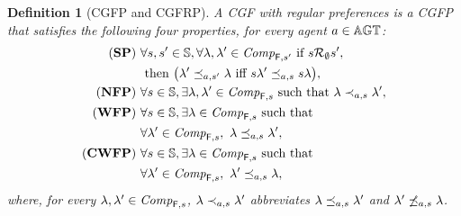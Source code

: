 \documentclass{article}
\newtheorem{definition}{Definition}
\begin{document}
\begin{definition}[CGFP and CGFRP]
A CGF with regular preferences
is a CGFP that satisfies the following four properties, 
for every agent $a \in \mathbb{AGT}$:
    \begin{align*}
       (\mathbf{SP}) \ & \forall s,s' \in \mathbb{S} ,
          \forall \lambda, \lambda' \in 
          \mathit{Comp}_{\mathsf{F},s' } 
          \text{ if } s \mathcal{R}_{\emptyset }  s',
          \\ 
          &
          \text{ then }
          \big(
        \lambda'   \preceq_{a,s'}\lambda  \text{ iff }
        s \lambda'   \preceq_{a,s } s\lambda 
          \big), \\
          (\mathbf{NFP})\  &\forall s\in \mathbb{S}, \exists \lambda ,\lambda' \in \mathit{Comp}_{\mathsf{F},s}\text{ such that } \lambda \prec_{a,s} \lambda' ,\\
          (\mathbf{WFP})\  &\forall s\in \mathbb{S}, \exists \lambda \in \mathit{Comp}_{\mathsf{F},s}\text{ such that } \\
          &\forall \lambda' \in  \mathit{Comp}_{\mathsf{F},s}, \ \lambda \preceq_{a,s} \lambda' ,\\
          (\mathbf{CWFP})\  &\forall s\in \mathbb{S}, \exists \lambda \in \mathit{Comp}_{\mathsf{F},s}\text{ such that }\\
          & \forall \lambda' \in \mathit{Comp}_{\mathsf{F},s}, \ \lambda' \preceq_{a,s} \lambda,
          \end{align*}
where, for every $\lambda, \lambda' \in\mathit{Comp}_{\mathsf{F},s} $, 
$\lambda \prec_{a,s} \lambda' $
abbreviates $\lambda \preceq_{a,s} \lambda' $
and
$\lambda'\not  \preceq_{a,s} \lambda $. 

\end{definition}
\end{document}
